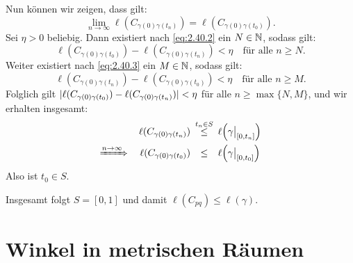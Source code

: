 \begin{beweis}
\begin{itemize}
		Nun können wir zeigen, dass gilt:
		\[
			\lim\limits_{n \rightarrow \infty} \ell(C_{\gamma(0)\gamma(t_n)}) = \ell(C_{\gamma(0)\gamma(t_0)}).
		\]
		Sei $\eta > 0$ beliebig.
		Dann existiert nach \eqref{eq:2.40.2} ein $N \in \mathbb{N}$, sodass gilt:
		\[
			\ell(C_{\gamma(0)\gamma(t_0)}) - \ell(C_{\gamma(0)\gamma(t_n)}) < \eta \quad \text{für alle } n \geq N.
		\]
		Weiter existiert nach \eqref{eq:2.40.3} ein $M \in \mathbb{N}$, sodass gilt:
		\[
			\ell(C_{\gamma(0)\gamma(t_n)}) - \ell(C_{\gamma(0)\gamma(t_0)}) < \eta \quad \text{für alle } n \geq M.
		\]		
		Folglich gilt $\lvert\ell(C_{\gamma(0)\gamma(t_0)}) - \ell(C_{\gamma(0)\gamma(t_n)})\rvert < \eta$ für alle $n \geq \max\{N,M\}$, und wir erhalten insgesamt:
		\begin{align*}
			\ell(C_{\gamma(0)\gamma(t_n)}) &\stack{t_n \in S}{\leq} \ell\enbrace*{\gamma \big|_{[0,t_n]}} \\
			\xRightarrow{n \rightarrow \infty} \quad \ell(C_{\gamma(0)\gamma(t_0)}) &\stack{}{\leq} \ell\enbrace*{\gamma \big|_{[0,t_0]}}
		\end{align*}
		Also ist $t_0 \in S$.
	\end{itemize}
	Insgesamt folgt $S = [0,1]$ und damit $\ell(C_{pq}) \leq \ell(\gamma)$. \qedhere
\end{beweis}

\section{Winkel in metrischen Räumen}
\label{sec:2.4}

